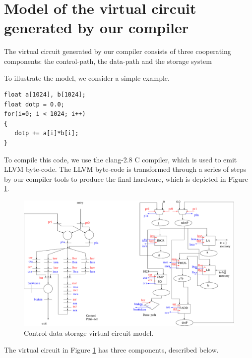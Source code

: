 \documentclass[conference]{IEEEtran}
\begin{document}



\section{Model of the virtual circuit generated by our compiler}

The virtual circuit generated by our compiler consists of three
cooperating components: the control-path, the data-path and
the storage system \cite{ahir}

To illustrate the model, we consider a simple example.
\begin{verbatim}
float a[1024], b[1024];
float dotp = 0.0;
for(i=0; i < 1024; i++)
{
   dotp += a[i]*b[i];
}
\end{verbatim}
To compile this code, we use the clang-2.8 \cite{clang} C compiler, 
which is used to emit LLVM \cite{llvm} byte-code.  The LLVM byte-code
is transformed through a series of steps by our compiler tools to
produce the final hardware, which is depicted in Figure \ref{fig:dotP}.
\begin{figure}[ht]
  \centering
  \includegraphics[width=15cm]{dotP.eps}
  \caption{Control-data-storage virtual circuit model.}
  \label{fig:dotP}
\end{figure}
The virtual circuit in Figure \ref{fig:dotP} has three components,
described below.
\end{document}
